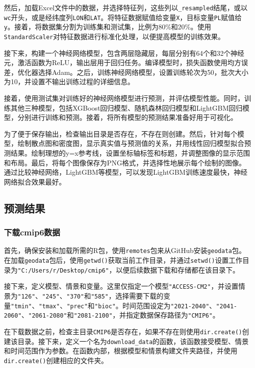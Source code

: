 \documentclass{article}
\begin{document}
然后，加载Excel文件中的数据，并选择特征列，这些列以\texttt{\_resampled}结尾，或以\texttt{wc}开头，或是经纬度列\texttt{LON}和\texttt{LAT}。将特征数据赋值给变量\texttt{X}，目标变量\texttt{PL}赋值给\texttt{y}。接着，将数据集分割为训练集和测试集，比例为80\%和20\%。使用\texttt{StandardScaler}对特征数据进行标准化处理，以便提高模型的训练效果。

接下来，构建一个神经网络模型，包含两层隐藏层，每层分别有64个和32个神经元，激活函数为ReLU，输出层用于回归任务。编译模型时，损失函数使用均方误差，优化器选择Adam。之后，训练神经网络模型，设置训练轮次为50，批次大小为10，并设置不输出训练过程的详细信息。

接着，使用测试集对训练好的神经网络模型进行预测，并评估模型性能。同时，训练其他三种模型，包括XGBoost回归模型、随机森林回归模型和LightGBM回归模型，分别进行训练和预测。接着，将所有模型的预测结果准备好用于可视化。

为了便于保存输出，检查输出目录是否存在，不存在则创建。然后，针对每个模型，绘制散点图和密度图，显示真实值与预测值的关系，并用线性回归模型拟合预测结果。绘制理想的y=x参考线，设置坐标轴标签和标题，并调整图像的显示范围和布局。最后，将每个图像保存为PNG格式，并选择性地展示每个绘制的图像。
通过比较神经网络，LightGBM等模型，可以发现LightGBM训练速度最快，神经网络拟合效果最好。

\subsection{预测结果}

\subsubsection{下载cmip6数据}
首先，确保安装和加载所需的R包，使用\texttt{remotes}包来从GitHub安装\texttt{geodata}包。在加载\texttt{geodata}包后，使用\texttt{getwd()}获取当前工作目录，并通过\texttt{setwd()}设置工作目录为\texttt{"C:/Users/r/Desktop/cmip6"}，以便后续数据下载和存储都在该目录下。

接下来，定义模型、情景和变量。这里仅指定一个模型\texttt{"ACCESS-CM2"}，并设置情景为\texttt{"126"}、\texttt{"245"}、\texttt{"370"}和\texttt{"585"}，选择需要下载的变量\texttt{"tmin"}、\texttt{"tmax"}、\texttt{"prec"}和\texttt{"bioc"}。时间范围设定为\texttt{"2021-2040"}、\texttt{"2041-2060"}、\texttt{"2061-2080"}和\texttt{"2081-2100"}，并指定数据保存路径为\texttt{"CMIP6"}。

在下载数据之前，检查主目录\texttt{CMIP6}是否存在，如果不存在则使用\texttt{dir.create()}创建该目录。接下来，定义一个名为\texttt{download\_data}的函数，该函数接受模型、情景和时间范围作为参数。在函数内部，根据模型和情景构建文件夹路径，并使用\texttt{dir.create()}创建相应的文件夹。
\end{document}

